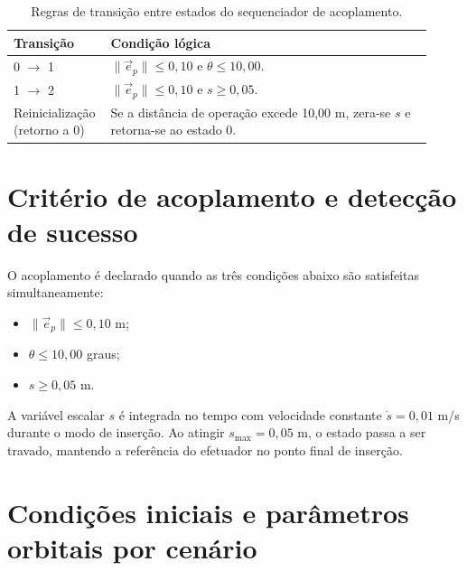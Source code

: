 \begin{table}[H]
\centering
\caption{Regras de transição entre estados do sequenciador de acoplamento.}
\label{tab:apD_regras_transicao}
\small
\begin{tabular}{|p{0.18\linewidth}|p{0.74\linewidth}|}
\hline
\textbf{Transição} & \textbf{Condição lógica}\\
\hline
0 $\rightarrow$ 1 &
$\|\vec{e}_p\| \leq 0{,}10$ \; e \; $\theta \leq 10{,}00$.\\
\hline
1 $\rightarrow$ 2 &
$\|\vec{e}_p\| \leq 0{,}10$ \; e \; $s \geq 0{,}05$.\\
\hline
Reinicialização (retorno a 0) &
Se a distância de operação excede 10,00 m, zera-se $s$ e retorna-se ao estado 0.\\
\hline
\end{tabular}
\end{table}


\section{Critério de acoplamento e detecção de sucesso}
\label{ap:apendiceE_acoplamento}

O acoplamento é declarado quando as três condições abaixo são satisfeitas simultaneamente:

\begin{itemize}
    \item $\|\vec{e}_p\| \leq 0{,}10$ m;
    \item $\theta \leq 10{,}00$ graus;
    \item $s \geq 0{,}05$ m.
\end{itemize}

A variável escalar $s$ é integrada no tempo com velocidade constante $\dot{s}=0{,}01$ m/s durante o modo de inserção.
Ao atingir $s_{\max}=0{,}05$ m, o estado passa a ser travado, mantendo a referência do efetuador no ponto final de inserção.


\section{Condições iniciais e parâmetros orbitais por cenário}
\label{ap:apendiceF_orbita_cenarios}

